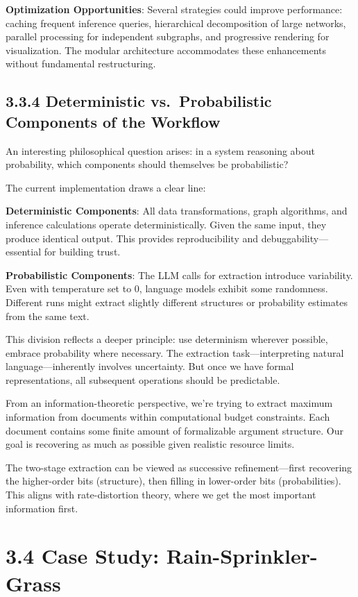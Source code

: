\documentclass[
  11pt,
  letterpaper,
  openany]{book}
\begin{document}
\textbf{Optimization Opportunities}: Several strategies could improve
performance: caching frequent inference queries, hierarchical
decomposition of large networks, parallel processing for independent
subgraphs, and progressive rendering for visualization. The modular
architecture accommodates these enhancements without fundamental
restructuring.

\subsection{3.3.4 Deterministic vs.~Probabilistic Components of the
Workflow}\label{sec-deterministic-probabilistic}

An interesting philosophical question arises: in a system reasoning
about probability, which components should themselves be probabilistic?

The current implementation draws a clear line:

\textbf{Deterministic Components}: All data transformations, graph
algorithms, and inference calculations operate deterministically. Given
the same input, they produce identical output. This provides
reproducibility and debuggability---essential for building trust.

\textbf{Probabilistic Components}: The LLM calls for extraction
introduce variability. Even with temperature set to 0, language models
exhibit some randomness. Different runs might extract slightly different
structures or probability estimates from the same text.

This division reflects a deeper principle: use determinism wherever
possible, embrace probability where necessary. The extraction
task---interpreting natural language---inherently involves uncertainty.
But once we have formal representations, all subsequent operations
should be predictable.

From an information-theoretic perspective, we're trying to extract
maximum information from documents within computational budget
constraints. Each document contains some finite amount of formalizable
argument structure. Our goal is recovering as much as possible given
realistic resource limits.

The two-stage extraction can be viewed as successive refinement---first
recovering the higher-order bits (structure), then filling in
lower-order bits (probabilities). This aligns with rate-distortion
theory, where we get the most important information first.

\section{3.4 Case Study:
Rain-Sprinkler-Grass}\label{sec-case-rain-sprinkler}
\end{document}
